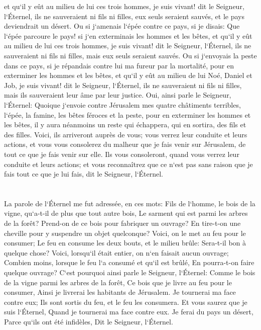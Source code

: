 \verse et qu`il y eût au milieu de lui ces trois hommes, je suis vivant! dit le Seigneur, l`Éternel, ils ne sauveraient ni fils ni filles, eux seuls seraient sauvés, et le pays deviendrait un désert. 
\verse Ou si j`amenais l`épée contre ce pays, si je disais: Que l`épée parcoure le pays! si j`en exterminais les hommes et les bêtes, 
\verse et qu`il y eût au milieu de lui ces trois hommes, je suis vivant! dit le Seigneur, l`Éternel, ils ne sauveraient ni fils ni filles, mais eux seuls seraient sauvés. 
\verse Ou si j`envoyais la peste dans ce pays, si je répandais contre lui ma fureur par la mortalité, pour en exterminer les hommes et les bêtes, 
\verse et qu`il y eût au milieu de lui Noé, Daniel et Job, je suis vivant! dit le Seigneur, l`Éternel, ils ne sauveraient ni fils ni filles, mais ils sauveraient leur âme par leur justice. 
\verse Oui, ainsi parle le Seigneur, l`Éternel: Quoique j`envoie contre Jérusalem mes quatre châtiments terribles, l`épée, la famine, les bêtes féroces et la peste, pour en exterminer les hommes et les bêtes, 
\verse il y aura néanmoins un reste qui échappera, qui en sortira, des fils et des filles. Voici, ils arriveront auprès de vous; vous verrez leur conduite et leurs actions, et vous vous consolerez du malheur que je fais venir sur Jérusalem, de tout ce que je fais venir sur elle. 
\verse Ils vous consoleront, quand vous verrez leur conduite et leurs actions; et vous reconnaîtrez que ce n`est pas sans raison que je fais tout ce que je lui fais, dit le Seigneur, l`Éternel. 

\chapter{}

\verse La parole de l`Éternel me fut adressée, en ces mots: 
\verse Fils de l`homme, le bois de la vigne, qu`a-t-il de plus que tout autre bois, Le sarment qui est parmi les arbres de la forêt? 
\verse Prend-on de ce bois pour fabriquer un ouvrage? En tire-t-on une cheville pour y suspendre un objet quelconque? 
\verse Voici, on le met au feu pour le consumer; Le feu en consume les deux bouts, et le milieu brûle: Sera-t-il bon à quelque chose? 
\verse Voici, lorsqu`il était entier, on n`en faisait aucun ouvrage; Combien moins, lorsque le feu l`a consumé et qu`il est brûlé, En pourra-t-on faire quelque ouvrage? 
\verse C`est pourquoi ainsi parle le Seigneur, l`Éternel: Comme le bois de la vigne parmi les arbres de la forêt, Ce bois que je livre au feu pour le consumer, Ainsi je livrerai les habitants de Jérusalem. 
\verse Je tournerai ma face contre eux; Ils sont sortis du feu, et le feu les consumera. Et vous saurez que je suis l`Éternel, Quand je tournerai ma face contre eux. 
\verse Je ferai du pays un désert, Parce qu`ils ont été infidèles, Dit le Seigneur, l`Éternel. 

